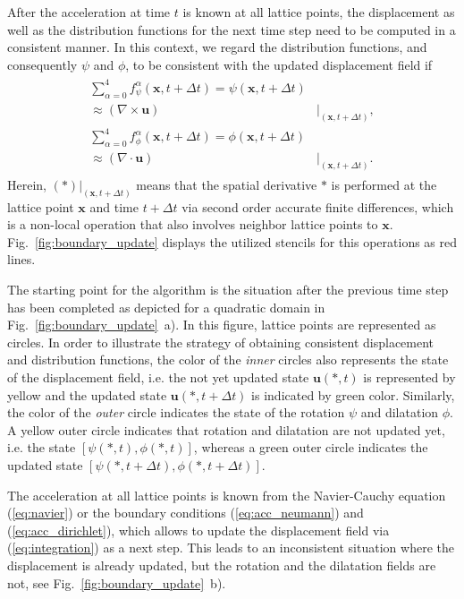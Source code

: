 \documentclass{article}
\renewcommand{\vec}{\boldsymbol}        %
\begin{document}
After the acceleration at time $t$ is known at all lattice points, the displacement as well as the distribution functions for the next time step need to be computed in a consistent manner. In this context, we regard the distribution functions, and consequently $\psi$ and $\phi$, to be consistent with the updated displacement field if 
\begin{align}
\begin{split}
    \sum_{\alpha=0}^4 f_{\psi}^{\alpha}(\vec{x},t+\Delta{t}) = \psi(\vec{x},t+\Delta{t})&\\
    \approx (\nabla\times\vec{u})&\vert_{(\vec{x},t+\Delta{t})}, \\
    \sum_{\alpha=0}^4 f_{\phi}^{\alpha}(\vec{x},t+\Delta{t}) = \phi(\vec{x},t+\Delta{t})&\\
    \approx (\nabla\cdot{\vec{u}})&\vert_{(\vec{x},t+\Delta{t})}.
    \label{eq:consistency}
\end{split}
\end{align}
Herein, $(*)\vert_{(\vec{x},t+\Delta{t})}$ means that the spatial derivative $*$ is performed at the lattice point $\vec{x}$ and time $t+\Delta{t}$ via second order accurate finite differences, which is a non-local operation that also involves neighbor lattice points to $\vec{x}$. Fig.~\ref{fig:boundary_update} displays the utilized stencils for this operations as red lines.

The starting point for the algorithm is the situation after the previous time step has been completed as depicted for a quadratic domain in Fig.~\ref{fig:boundary_update}~a). In this figure, lattice points are represented as circles. In order to illustrate the strategy of obtaining consistent displacement and distribution functions, the color of the \textsl{inner} circles also represents the state of the displacement field, i.e. the not yet updated state $\vec{u}(*,t)$ is represented by yellow and the updated state  $\vec{u}(*,t+\Delta{t})$ is indicated by green color. Similarly, the color of the \textsl{outer} circle indicates the state of the rotation $\psi$ and dilatation $\phi$. A yellow outer circle indicates that rotation and dilatation are not updated yet, i.e. the state $\left[\psi(*,t), \phi(*,t)\right]$, whereas a green outer circle indicates the updated state $\left[\psi(*,t+\Delta{t}), \phi(*,t+\Delta{t})\right]$.

The acceleration at all lattice points is known from the Navier-Cauchy equation (\ref{eq:navier}) or the boundary conditions (\ref{eq:acc_neumann}) and (\ref{eq:acc_dirichlet}), which allows to update the displacement field  via (\ref{eq:integration}) as a next step. This leads to an inconsistent situation where the displacement is already updated, but the rotation and the dilatation fields are not, see Fig.~\ref{fig:boundary_update}~b).
\end{document}
